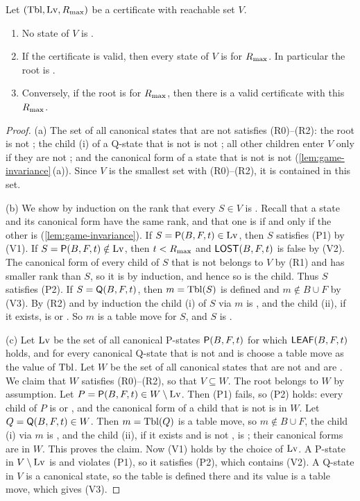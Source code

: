 \begin{lemma}\label{lem:certificate}
Let $(\mathrm{Tbl},\mathrm{Lv},R_{\max})$ be a certificate with reachable set $V$.
\begin{enumerate}[label=\textup{(\alph*)},leftmargin=2.4em]
\item No state of $V$ is \VOID.
\item If the certificate is valid, then every state of $V$ is \WON{} for $R_{\max}$. In particular the root is
  \WON.
\item Conversely, if the root is \WON{} for $R_{\max}$, then there is a valid certificate with this $R_{\max}$.
\end{enumerate}
\end{lemma}

\begin{proof}
(a) The set of all canonical states that are not \VOID{} satisfies (R0)--(R2): the root is not \VOID; the
child \textup{(i)} of a Q-state that is not \VOID{} is not \VOID; all other children enter $V$ only if they
are not \VOID; and the canonical form of a state that is not \VOID{} is not \VOID{}
(\cref{lem:game-invariance}\,(a)). Since $V$ is the smallest set with (R0)--(R2), it is contained in this
set.

(b) We show by induction on the rank that every $S\in V$ is \WON. Recall that a state and its canonical form
have the same rank, and that one is \WON{} if and only if the other is (\cref{lem:game-invariance}).
If $S=\mathsf{P}(B,F,t)\in\mathrm{Lv}$, then $S$ satisfies (P1) by (V1). If $S=\mathsf{P}(B,F,t)\notin\mathrm{Lv}$, then $t<R_{\max}$ and
$\mathsf{LOST}(B,F,t)$ is false by (V2). The canonical form of every child of $S$ that is not \VOID{} belongs to $V$
by (R1) and has smaller rank than $S$, so it is \WON{} by induction, and hence so is the child. Thus $S$
satisfies (P2). If $S=\mathsf{Q}(B,F,t)$, then $m=\mathrm{Tbl}(S)$ is defined and $m\notin B\cup F$ by (V3). By (R2) and by
induction the child \textup{(i)} of $S$ via $m$ is \WON, and the child \textup{(ii)}, if it exists, is \VOID{}
or \WON. So $m$ is a table move for $S$, and $S$ is \WON.

(c) Let $\mathrm{Lv}$ be the set of all canonical P-states $\mathsf{P}(B,F,t)$ for which $\mathsf{LEAF}(B,F,t)$ holds, and for every
canonical Q-state that is not \VOID{} and is \WON{} choose a table move as the value of $\mathrm{Tbl}$. Let $W$ be
the set of all canonical states that are not \VOID{} and are \WON. We claim that $W$ satisfies (R0)--(R2),
so that $V\subseteq W$. The root belongs to $W$ by assumption. Let $P=\mathsf{P}(B,F,t)\in W\setminus\mathrm{Lv}$. Then
(P1) fails, so (P2) holds: every child of $P$ is \WON{} or \VOID, and the canonical form of a child that is
not \VOID{} is in $W$. Let $Q=\mathsf{Q}(B,F,t)\in W$. Then $m=\mathrm{Tbl}(Q)$ is a table move, so $m\notin B\cup F$, the
child \textup{(i)} via $m$ is \WON, and the child \textup{(ii)}, if it exists and is not \VOID, is \WON; their
canonical forms are in $W$. This proves the claim. Now (V1) holds by the choice of $\mathrm{Lv}$. A P-state in
$V\setminus\mathrm{Lv}$ is \WON{} and violates (P1), so it satisfies (P2), which contains (V2). A Q-state in $V$ is a
canonical \WON{} state, so the table is defined there and its value is a table move, which gives (V3).
\end{proof}

